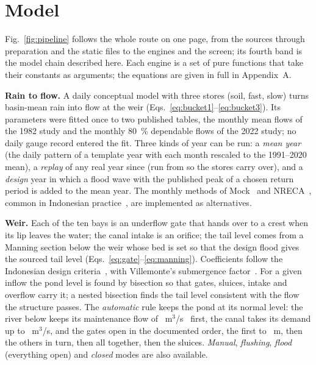 \documentclass[10pt,a4paper,twocolumn]{extarticle}
\newcommand{\cms}{m$^3$/s}
\begin{document}
\section{Model}

Fig.~\ref{fig:pipeline} follows the whole route on one page, from the sources through preparation and the static
files to the engines and the screen; its fourth band is the model chain described here. Each engine is a set of pure
functions that take their constants as arguments; the equations are given in full in Appendix~A.


\textbf{Rain to flow.} A daily conceptual model with three stores (soil, fast, slow) turns basin-mean rain into flow
at the weir (Eqs.~\ref{eq:bucket1}--\ref{eq:bucket3}). Its parameters were fitted once to two published
tables, the monthly mean flows of the 1982 study and the monthly 80~\% dependable flows of the 2022 study; no daily
gauge record entered the fit. Three kinds of year can be run: a \emph{mean year} (the daily pattern of a template
year with each month rescaled to the 1991--2020 mean), a \emph{replay} of any real year since \RepYearFirst{} (run
from \RepYearFirst{} so the stores carry over), and a \emph{design} year in which a flood wave with the published
peak of a chosen return period is added to the mean year. The monthly methods of Mock~\citep{mock1973} and
NRECA~\citep{crawford1981}, common in Indonesian practice~\citep{kp01}, are implemented as alternatives.

\textbf{Weir.} Each of the ten bays is an underflow gate that hands over to a crest when its lip leaves the water;
the canal intake is an orifice; the tail level comes from a Manning section below the weir whose bed is set so that
the design flood gives the sourced tail level (Eqs.~\ref{eq:gate}--\ref{eq:manning}). Coefficients follow the
Indonesian design criteria~\citep{kp02}, with Villemonte's submergence factor~\citep{villemonte1947}. For a given
inflow the pond level is found by bisection so that gates, sluices, intake and overflow carry it; a nested bisection
finds the tail level consistent with the flow the structure passes. The \emph{automatic} rule keeps the pond at its
normal level: the river below keeps its maintenance flow of \EnvFlow~\cms~\citep{jica2003} first, the canal takes its demand up to
\IntakeTarget~\cms, and the gates open in the documented order, the first to \FirstOpening~m, then the others in
turn, then all together, then the sluices. \emph{Manual}, \emph{flushing}, \emph{flood} (everything open) and
\emph{closed} modes are also available.
\end{document}
